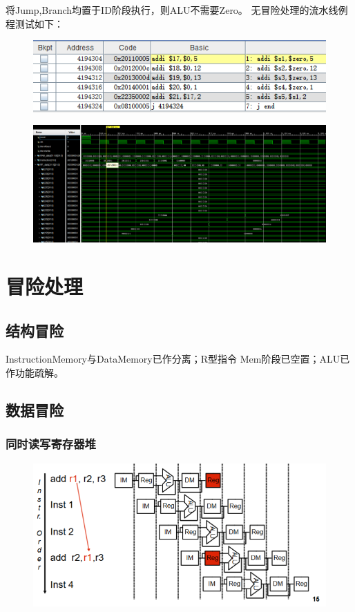 \documentclass[10pt]{article}
\begin{document}
将Jump,Branch均置于ID阶段执行，则ALU不需要Zero。
无冒险处理的流水线例程测试如下：
\begin{figure}[H]
    \centering
    \includegraphics[scale=0.7]{hazardno.png}
\end{figure}
\begin{figure}[H]
    \centering
    \includegraphics[scale=0.4]{norisk.png}
    \end{figure}
\newpage
\section{冒险处理}
\subsection{结构冒险}
InstructionMemory与DataMemory已作分离；R型指令
Mem阶段已空置；ALU已作功能疏解。
\subsection{数据冒险}
\subsubsection{同时读写寄存器堆}
\begin{figure}[H]
    \centering
    \includegraphics[scale=0.4]{reguse.png}
    \end{figure}
\end{document}
